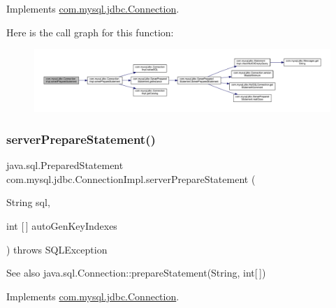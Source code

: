 Implements \mbox{\hyperlink{interfacecom_1_1mysql_1_1jdbc_1_1_connection_aa815a139c20cb2ecb32bc50fca219c6e}{com.\+mysql.\+jdbc.\+Connection}}.

Here is the call graph for this function\+:\nopagebreak
\begin{figure}[H]
\begin{center}
\leavevmode
\includegraphics[width=350pt]{classcom_1_1mysql_1_1jdbc_1_1_connection_impl_afda4b5397a3241273af80d0ba702c6a0_cgraph}
\end{center}
\end{figure}
\mbox{\label{classcom_1_1mysql_1_1jdbc_1_1_connection_impl_a47beacf4b3a8a745c22fb6f1cd7b8e60}} 
\subsubsection{\texorpdfstring{server\+Prepare\+Statement()}{serverPrepareStatement()}\hspace{0.1cm}{\footnotesize\ttfamily [5/6]}}
{\footnotesize\ttfamily java.\+sql.\+Prepared\+Statement com.\+mysql.\+jdbc.\+Connection\+Impl.\+server\+Prepare\+Statement (\begin{DoxyParamCaption}\item[{String}]{sql,  }\item[{int \mbox{[}$\,$\mbox{]}}]{auto\+Gen\+Key\+Indexes }\end{DoxyParamCaption}) throws S\+Q\+L\+Exception}

\begin{DoxySeeAlso}{See also}
java.\+sql.\+Connection\+::prepare\+Statement(\+String, int\mbox{[}$\,$\mbox{]}) 
\end{DoxySeeAlso}


Implements \mbox{\hyperlink{interfacecom_1_1mysql_1_1jdbc_1_1_connection_ad56f84a142159320cb267e94febd72d9}{com.\+mysql.\+jdbc.\+Connection}}.

